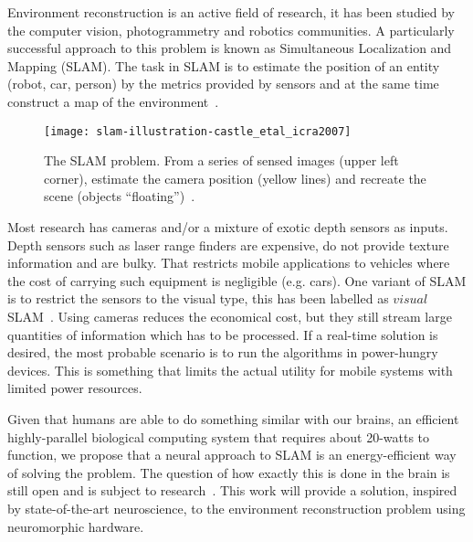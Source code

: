 Environment reconstruction is an active field of research, it has been studied by the computer vision, photogrammetry and robotics communities. A particularly successful approach to this problem is known as Simultaneous Localization and Mapping (SLAM). The task in SLAM is to estimate the position of an entity (robot, car, person) by the metrics provided by sensors and at the same time construct a map of the environment~\cite{Thrun2008_SLAM}.

\begin{figure}[hb]
  \begin{center}
    \texttt{[image: slam-illustration-castle\_etal\_icra2007]}
    \caption{The SLAM problem. From a series of sensed images (upper left corner), estimate the camera position (yellow lines) and recreate the scene (objects ``floating'')~\cite{slam-oxford-images}.}
  \end{center}
\end{figure}

Most research has cameras and/or a mixture of exotic depth sensors as inputs.
Depth sensors such as laser range finders are expensive, do not provide texture information and are bulky. That restricts mobile applications to vehicles where the cost of carrying such equipment is negligible (e.g. cars).
One variant of SLAM is to restrict the sensors to the visual type, this has been labelled as $visual$SLAM~\cite{Fuentes-Pacheco2012-slam}. Using cameras reduces the economical cost, but they still stream large quantities of information which has to be processed. If a real-time solution is desired, the most probable scenario is to run the algorithms in power-hungry devices. This is something that limits the actual utility for mobile systems with limited power resources. 

Given that humans are able to do something similar with our brains, an efficient highly-parallel biological computing system that requires about 20-watts to function, we propose that a neural approach to SLAM is an energy-efficient way of solving the problem. The question of how exactly this is done in the brain is still open and is subject to research~\cite{rat-slam}. This work will provide a solution, inspired by state-of-the-art neuroscience, to the environment reconstruction problem using neuromorphic hardware.

